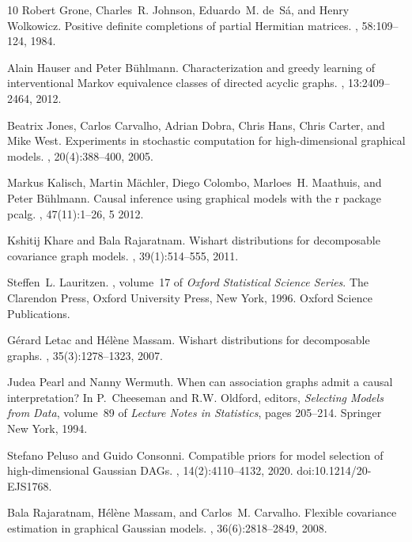 \documentclass[12pt]{article}
\theoremstyle{plain}
\theoremstyle{definition}
\theoremstyle{remark}
\begin{document}
\begin{thebibliography}{10}
Robert Grone, Charles~R. Johnson, Eduardo~M. de~S{\'a}, and Henry Wolkowicz.
\newblock Positive definite completions of partial {H}ermitian matrices.
, 58:109--124, 1984.

Alain Hauser and Peter B{\"u}hlmann.
\newblock Characterization and greedy learning of interventional {M}arkov
  equivalence classes of directed acyclic graphs.
, 13:2409--2464, 2012.

Beatrix Jones, Carlos Carvalho, Adrian Dobra, Chris Hans, Chris Carter, and
  Mike West.
\newblock Experiments in stochastic computation for high-dimensional graphical
  models.
, 20(4):388--400, 2005.

Markus Kalisch, Martin Mächler, Diego Colombo, Marloes~H. Maathuis, and Peter
  Bühlmann.
\newblock Causal inference using graphical models with the r package pcalg.
, 47(11):1--26, 5 2012.

Kshitij Khare and Bala Rajaratnam.
\newblock Wishart distributions for decomposable covariance graph models.
, 39(1):514--555, 2011.

Steffen~L. Lauritzen.
, volume~17 of {\em Oxford Statistical Science
  Series}.
\newblock The Clarendon Press, Oxford University Press, New York, 1996.
\newblock Oxford Science Publications.

G{\'e}rard Letac and H{\'e}l{\`e}ne Massam.
\newblock Wishart distributions for decomposable graphs.
, 35(3):1278--1323, 2007.

Judea Pearl and Nanny Wermuth.
\newblock When can association graphs admit a causal interpretation?
\newblock In P.~Cheeseman and R.W. Oldford, editors, {\em Selecting Models from
  Data}, volume~89 of {\em Lecture Notes in Statistics}, pages 205--214.
  Springer New York, 1994.

Stefano Peluso and Guido Consonni.
\newblock Compatible priors for model selection of high-dimensional
  Gaussian {DAG}s.
, 14(2):4110--4132, 2020.
\newblock doi:10.1214/20-EJS1768.

Bala Rajaratnam, H{\'e}l{\`e}ne Massam, and Carlos~M. Carvalho.
\newblock Flexible covariance estimation in graphical {G}aussian models.
, 36(6):2818--2849, 2008.


\end{thebibliography}
\end{document}
